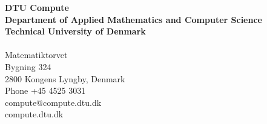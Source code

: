 \thispagestyle{empty} %
\frieze
\vspace*{\fill}
\noindent
\sffamily
\scriptsize
\textbf{DTU Compute}\\
\textbf{Department of Applied Mathematics and Computer Science}\\
\textbf{Technical University of Denmark}\\
\\
Matematiktorvet\\
Bygning 324\\
2800 Kongens Lyngby, Denmark\\
Phone +45 4525 3031\\
compute@compute.dtu.dk\\
compute.dtu.dk\\
\normalsize
\normalfont
\vspace*{2.5cm}
